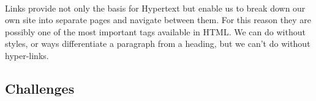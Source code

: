 \documentclass[10pt, a4paper, twosize]{article}
\begin{document}




\paragraph{} Links provide not only the basis for Hypertext but enable us to break down our own site into separate pages and navigate between them. For this reason they are possibly one of the most important tags available in HTML. We can do without styles, or ways differentiate a paragraph from a heading, but we can't do without hyper-links.

\subsection{Challenges}
\end{document}

